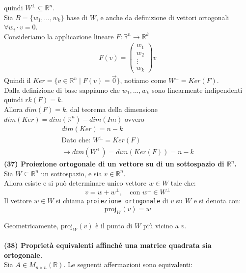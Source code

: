\documentclass[10pt]{extarticle}
\begin{document}
quindi $W^\bot \subseteq \mathbb{R}^n$.\\
Sia $B=\{w_1,\dots,w_k\}$ base di $W$, e anche da definizione di vettori ortogonali $\forall w_i \cdot v = 0$.\\
Consideriamo la applicazione lineare $F : \mathbb{R}^n \to \mathbb{R}^k$
\begin{align*}
    F(v)=\begin{pmatrix}
        w_1 \\
        w_2 \\
        \vdots \\
        w_k
    \end{pmatrix}v
\end{align*}
Quindi il $Ker=\{v \in \mathbb{R}^n \mid F(v)=\vec{0}\}$, notiamo come $W^\bot = Ker(F)$.\\
Dalla definizione di base sappiamo che $w_1,\dots,w_k$ sono linearmente indipendenti quindi $rk(F)=k$.\\
Allora $dim(F)=k$, dal teorema della dimensione $dim(Ker)=dim(\mathbb{R}^n)-dim(Im)$ ovvero 
\begin{align*}
    dim(Ker)=n-k \\
    \text{Dato che: } W^\bot = Ker(F) \\
    \to dim(W^\bot)=dim(Ker(F))=n-k
\end{align*}
\vspace{1em} 
\textbf{(37) Proiezione ortogonale di un vettore su di un sottospazio di \( \mathbb{R}^n \).} \\

Sia \( W \subseteq \mathbb{R}^n \) un sottospazio, e sia \( v \in \mathbb{R}^n \). \\
Allora esiste e si può determinare unico vettore \( w \in W \) tale che:
\[
v = w + w^\perp, \quad \text{con } w^\perp \in W^\perp
\]
Il vettore \( w \in W \) si chiama \texttt{proiezione ortogonale} di \( v \) su \( W \) e si denota con:
\[
\text{proj}_W(v) = w
\]

Geometricamente, \( \text{proj}_W(v) \) è il punto di \( W \) più vicino a \( v \). \\
\vspace{1em} \\
\textbf{(38) Proprietà equivalenti affinché una matrice quadrata sia ortogonale.} \\

Sia \( A \in M_{n \times n}(\mathbb{R}) \). Le seguenti affermazioni sono equivalenti:
\end{document}
